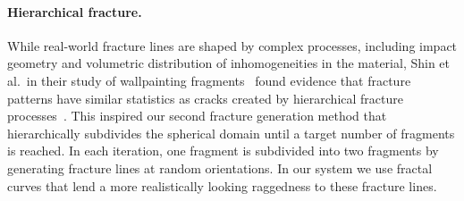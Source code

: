 \documentclass[acmlarge,screen,dvipsnames]{acmart}
\begin{document}
\paragraph{Hierarchical fracture.}
%
While real-world fracture lines are shaped by complex processes,
including impact geometry and volumetric distribution of
inhomogeneities in the material, Shin et al.\ in their study of
wallpainting fragments~\cite{Shin:2012:ASF:2362402.2362404} found
evidence that fracture patterns have similar statistics as cracks
created by hierarchical fracture
processes~\cite{Bohn:2005:Four}.
%
This inspired our second fracture generation method that
hierarchically subdivides the spherical domain until a target number
of fragments is reached. In each iteration, one fragment is subdivided into 
two fragments by generating fracture lines at random orientations. 
%
In our system we use fractal curves that lend a more realistically
looking raggedness to these fracture lines.
\end{document}
